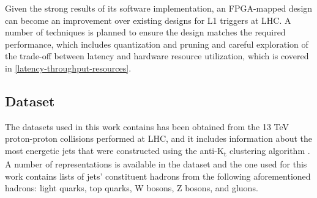 Given the strong results of its software implementation, an FPGA-mapped design can become an improvement over existing designs for L1 triggers at LHC. A number of techniques is planned to ensure the design matches the required performance, which includes quantization and pruning \cite{45-liang2021pruning} and careful exploration of the trade-off between latency and hardware resource utilization, which is covered in \autoref{latency-throughput-resources}.


\subsection{Dataset}
The datasets used in this work contains has been obtained from the 13 TeV proton-proton collisions performed at LHC, and it includes information about the most energetic jets \cite{31-pierinihls4ml,32-pierinihls4ml,33-pierinihls4ml,34-pierinihls4ml} that were constructed using the anti-K\textsubscript{t} clustering algorithm \cite{35-cacciari2008anti-kt}. A number of representations is available in the dataset and the one used for this work contains lists of jets' constituent hadrons from the following aforementioned hadrons: light quarks, top quarks, W bosons, Z bosons, and gluons.



